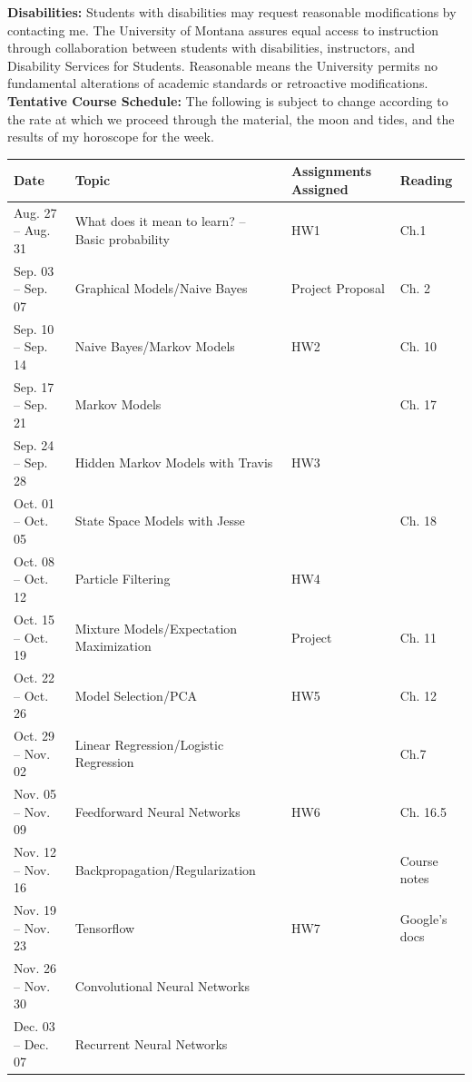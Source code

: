 \documentclass[11pt]{article}
\begin{document}
\textbf{\large Disabilities:}
Students with disabilities may request reasonable modifications by contacting me. The University of Montana assures equal access to instruction through collaboration between students with disabilities, instructors, and Disability Services for Students. Reasonable means the University permits no fundamental alterations of academic standards or retroactive modifications. \vspace{5mm} \\
\textbf {\large Tentative Course Schedule:}
The following is subject to change according to the rate at which we proceed through the material, the moon and tides, and the results of my horoscope for the week.
\begin{longtable}{| l | p{6cm} | p{3cm} | p{3cm} | }
\hline
\textbf{Date} & \textbf{Topic} & \textbf{Assignments Assigned} & \textbf{Reading} \\
\hline
Aug. 27 -- Aug. 31 & What does it mean to learn? -- Basic probability & HW1& Ch.1 \\
Sep. 03 -- Sep. 07 & Graphical Models/Naive Bayes & Project Proposal & Ch. 2 \\
Sep. 10 -- Sep. 14 & Naive Bayes/Markov Models  & HW2& Ch. 10 \\
Sep. 17 -- Sep. 21 & Markov Models & & Ch. 17 \\
Sep. 24 -- Sep. 28 & Hidden Markov Models with Travis & HW3 & \\
Oct. 01 -- Oct. 05 & State Space Models with Jesse & & Ch. 18 \\
Oct. 08 -- Oct. 12 & Particle Filtering & HW4 & \\
Oct. 15 -- Oct. 19 & Mixture Models/Expectation Maximization & Project & Ch. 11\\
Oct. 22 -- Oct. 26 & Model Selection/PCA & HW5 & Ch. 12 \\
Oct. 29 -- Nov. 02 & Linear Regression/Logistic Regression & & Ch.7 \\
Nov. 05 -- Nov. 09 & Feedforward Neural Networks & HW6 & Ch. 16.5 \\
Nov. 12 -- Nov. 16 & Backpropagation/Regularization & & Course notes \\
Nov. 19 -- Nov. 23 & Tensorflow & HW7 & Google's docs \\
Nov. 26 -- Nov. 30 & Convolutional Neural Networks & & \\
Dec. 03 -- Dec. 07 & Recurrent Neural Networks & & \\
\hline
\end{longtable} 
\end{document}

